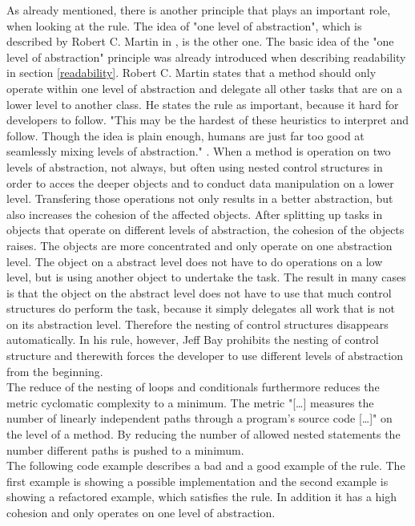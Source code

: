 As already mentioned, there is another principle that plays an important role, when looking at the rule. The idea of "one level of abstraction", which is described by Robert C. Martin in \cite{cc}, is the other one. The basic idea of the "one level of abstraction" principle was already introduced when describing readability in section \ref{readability}. Robert C. Martin states that a method should only operate within one level of abstraction and delegate all other tasks that are on a lower level to another class. He states the rule as important, because it hard for developers to follow. "This may be the hardest of these heuristics to interpret and follow. Though the idea is plain enough, humans are just far too good at seamlessly mixing levels of abstraction." \cite{cc}. When a method is operation on two levels of abstraction, not always, but often using nested control structures in order to acces the deeper objects and to conduct data manipulation on a lower level. Transfering those operations not only results in a better abstraction, but also increases the cohesion of the affected objects. After splitting up tasks in objects that operate on different levels of abstraction, the cohesion of the objects raises. The objects are more concentrated and only operate on one abstraction level. The object on a abstract level does not have to do operations on a low level, but is using another object to undertake the task. The result in many cases is that the object on the abstract level does not have to use that much control structures do perform the task, because it simply delegates all work that is not on its abstraction level. Therefore the nesting of control structures disappears automatically. In his rule, however, Jeff Bay prohibits the nesting of control structure and therewith forces the developer to use different levels of abstraction from the beginning. 
\\

The reduce of the nesting of loops and conditionals furthermore reduces the metric cyclomatic complexity to a minimum. The metric "[\dots] measures the number of linearly independent paths through a program's source code [\dots]" \cite[Cyclomatic complexity]{wiki} on the level of a method. By reducing the number of allowed nested statements the number different paths is pushed to a minimum.
\\

The following code example describes a bad and a good example of the rule. The first example is showing a possible implementation and the second example is showing a refactored example, which satisfies the rule. In addition it has a high cohesion and only operates on one level of abstraction. 
\\


